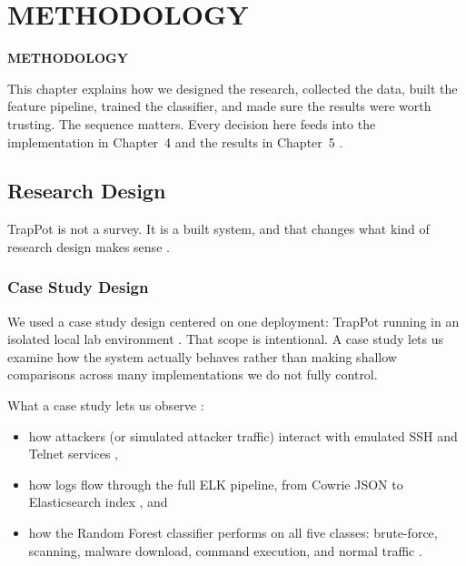 \chapter{METHODOLOGY}
\pagebreak

\begin{center}
{\LARGE\textbf{METHODOLOGY}}
\end{center}


This chapter explains how we designed the research, collected the data, built the feature pipeline, trained the classifier, and made sure the results were worth trusting. The sequence matters. Every decision here feeds into the implementation in Chapter~4 and the results in Chapter~5 \cite{franco2021survey,rodriguezgomez2025systematic,lanz2025optimizing}.

\section{Research Design}
\label{sec:research_design}

TrapPot is not a survey. It is a built system, and that changes what kind of research design makes sense \cite{franco2021survey,rodriguezgomez2025systematic}.

\subsection{Case Study Design}
\label{subsec:case_study}

We used a case study design centered on one deployment: TrapPot running in an isolated local lab environment \cite{albaseer2024fedpot,commey2025blockchain}. That scope is intentional. A case study lets us examine how the system actually behaves rather than making shallow comparisons across many implementations we do not fully control.

What a case study lets us observe \cite{rodriguezgomez2025systematic,lanz2025optimizing}:

\begin{itemize}
\item how attackers (or simulated attacker traffic) interact with emulated SSH and Telnet services \cite{9071014,9558948,famera2025mirai},
\item how logs flow through the full ELK pipeline, from Cowrie JSON to Elasticsearch index \cite{9001068,log2evt2025}, and
\item how the Random Forest classifier performs on all five classes: brute-force, scanning, malware download, command execution, and normal traffic \cite{lee2021classification,karim2024efficient,saied2023comparative}.
\end{itemize}


